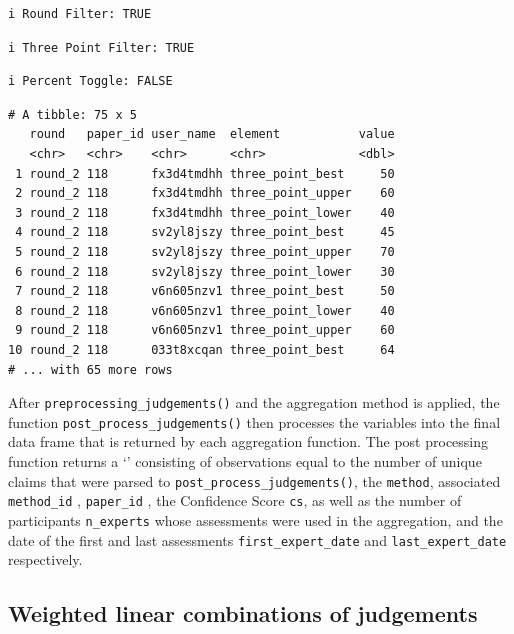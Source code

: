\documentclass[article]{jss}
\newcommand{\class}[1]{`\code{#1}'}
\begin{document}
\begin{tcolorbox}[enhanced jigsaw, colback=white, toprule=.15mm, colframe=quarto-callout-color-frame, arc=.35mm, rightrule=.15mm, bottomrule=.15mm, breakable, leftrule=.75mm, left=2mm, opacityback=0]
\begin{verbatim}
\end{verbatim}

\begin{verbatim}
i Round Filter: TRUE
\end{verbatim}

\begin{verbatim}
i Three Point Filter: TRUE
\end{verbatim}

\begin{verbatim}
i Percent Toggle: FALSE
\end{verbatim}

\begin{verbatim}
# A tibble: 75 x 5
   round   paper_id user_name  element           value
   <chr>   <chr>    <chr>      <chr>             <dbl>
 1 round_2 118      fx3d4tmdhh three_point_best     50
 2 round_2 118      fx3d4tmdhh three_point_upper    60
 3 round_2 118      fx3d4tmdhh three_point_lower    40
 4 round_2 118      sv2yl8jszy three_point_best     45
 5 round_2 118      sv2yl8jszy three_point_upper    70
 6 round_2 118      sv2yl8jszy three_point_lower    30
 7 round_2 118      v6n605nzv1 three_point_best     50
 8 round_2 118      v6n605nzv1 three_point_lower    40
 9 round_2 118      v6n605nzv1 three_point_upper    60
10 round_2 118      033t8xcqan three_point_best     64
# ... with 65 more rows
\end{verbatim}

After \texttt{preprocessing\_judgements()} and the aggregation method is
applied, the function \texttt{post\_process\_judgements()} then
processes the variables into the final data frame that is returned by
each aggregation function. The post processing function returns a
\class{tibble} consisting of observations equal to the number of unique
claims that were parsed to \texttt{post\_process\_judgements()}, the
\texttt{method}, associated \texttt{method\_id} , \texttt{paper\_id} ,
the Confidence Score \texttt{cs}, as well as the number of participants
\texttt{n\_experts} whose assessments were used in the aggregation, and
the date of the first and last assessments \texttt{first\_expert\_date}
and \texttt{last\_expert\_date} respectively.

\end{tcolorbox}

\hypertarget{sec-IntWAgg}{%
\subsection{Weighted linear combinations of
judgements}\label{sec-IntWAgg}}
\end{document}

